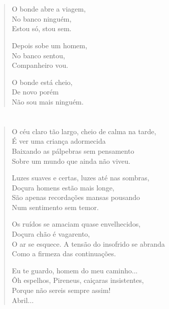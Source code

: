 \chapter*{}

\begin{verse}
O bonde abre a viagem,\\
No banco ninguém,\\
Estou só, stou sem.

Depois sobe um homem,\\
No banco sentou,\\
Companheiro vou.

O bonde está cheio,\\
De novo porém\\
Não sou mais ninguém.
\end{verse}

\chapter*{}

\begin{verse}
O céu claro tão largo, cheio de calma na tarde,\\
É ver uma criança adormecida\\
Baixando as pálpebras sem pensamento\\
Sobre um mundo que ainda não viveu.

Luzes suaves e certas, luzes até nas sombras,\\
Doçura homens estão mais longe,\\
São apenas recordações mansas pousando\\
Num sentimento sem temor.

Os ruídos se amaciam quase envelhecidos,\\
Doçura chão é vagarento,\\
O ar se esquece. A tensão do insofrido se abranda\\
Como a firmeza das continuações.

Eu te guardo, homem do meu caminho...\\
Ôh espelhos, Pireneus, caiçaras insistentes,\\
Porque não sereis sempre assim!\\
Abril...
\end{verse}

